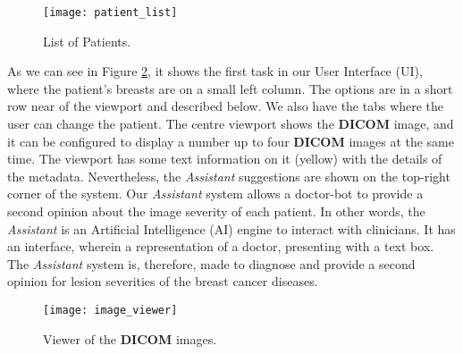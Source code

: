
\hfill

\begin{figure}[h]
\centering
\texttt{[image: patient\_list]}
\caption{List of Patients.}
\label{fig:patient_list}
\end{figure}

\hfill


As we can see in Figure \ref{fig:image_viewer}, it shows the first task in our User Interface (UI), where the patient's breasts are on a small left column. The options are in a short row near of the viewport and described below. We also have the tabs where the user can change the patient. The centre viewport shows the \textbf{DICOM} image, and it can be configured to display a number up to four \textbf{DICOM} images at the same time. The viewport has some text information on it (yellow) with the details of the metadata. Nevertheless, the \textit{Assistant} suggestions are shown on the top-right corner of the system. Our \textit{Assistant} system allows a doctor-bot to provide a second opinion about the image severity of each patient. In other words, the \textit{Assistant} is an Artificial Intelligence (AI) engine to interact with clinicians. It has an interface, wherein a representation of a doctor, presenting with a text box. The \textit{Assistant} system is, therefore, made to diagnose and provide a second opinion for lesion severities of the breast cancer diseases.

\clearpage


\hfill

\begin{figure}[h]
\centering
\texttt{[image: image\_viewer]}
\caption{Viewer of the \textbf{DICOM} images.}
\label{fig:image_viewer}
\end{figure}

\hfill


